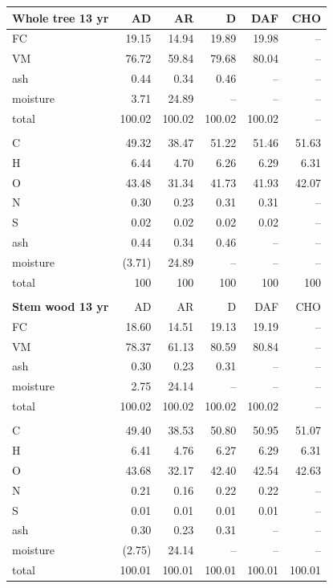 \begin{longtable}{lrrrrr}
    \textbf{Whole tree 13 yr} & AD & AR & D & DAF & CHO \\
    \midrule
    FC       & 19.15  & 14.94  & 19.89  & 19.98  & -- \\
    VM       & 76.72  & 59.84  & 79.68  & 80.04  & -- \\
    ash      & 0.44   & 0.34   & 0.46   & --     & -- \\
    moisture & 3.71   & 24.89  & --     & --     & -- \\
    total    & 100.02 & 100.02 & 100.02 & 100.02 & -- \\
    \\
    C        & 49.32  & 38.47  & 51.22  & 51.46  & 51.63 \\
    H        & 6.44   & 4.70   & 6.26   & 6.29   & 6.31 \\
    O        & 43.48  & 31.34  & 41.73  & 41.93  & 42.07 \\
    N        & 0.30   & 0.23   & 0.31   & 0.31   & -- \\
    S        & 0.02   & 0.02   & 0.02   & 0.02   & -- \\
    ash      & 0.44   & 0.34   & 0.46   & --     & -- \\
    moisture & (3.71) & 24.89  & --     & --     & -- \\
    total    & 100    & 100    & 100    & 100    & 100 \\
    \\

    \textbf{Stem wood 13 yr} & AD & AR & D & DAF & CHO \\
    \midrule
    FC       & 18.60  & 14.51  & 19.13  & 19.19  & -- \\
    VM       & 78.37  & 61.13  & 80.59  & 80.84  & -- \\
    ash      & 0.30   & 0.23   & 0.31   & --     & -- \\
    moisture & 2.75   & 24.14  & --     & --     & -- \\
    total    & 100.02 & 100.02 & 100.02 & 100.02 & -- \\
    \\
    C        & 49.40  & 38.53  & 50.80  & 50.95  & 51.07 \\
    H        & 6.41   & 4.76   & 6.27   & 6.29   & 6.31 \\
    O        & 43.68  & 32.17  & 42.40  & 42.54  & 42.63 \\
    N        & 0.21   & 0.16   & 0.22   & 0.22   & -- \\
    S        & 0.01   & 0.01   & 0.01   & 0.01   & -- \\
    ash      & 0.30   & 0.23   & 0.31   & --     & -- \\
    moisture & (2.75) & 24.14  & --     & --     & -- \\
    total    & 100.01 & 100.01 & 100.01 & 100.01 & 100.01 \\
\end{longtable}

